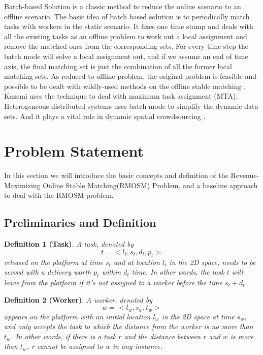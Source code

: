 \documentclass[color,twoside,amssymb,twocolumn]{article}
\begin{document}
Batch-based Solution\cite{kazemi2012geocrowd} is a classic method to reduce the online scenario to an offline scenario. The basic idea of batch based solution is to periodically match tasks with workers in the static scenario\cite{kazemi2012geocrowd,DBLP:conf/gis/KazemiSC13}. It fixes one time stamp and deals with all the existing tasks as an offline problem to work out a local assignment and remove the matched ones from the corresponding sets. For every time step the batch mode will solve a local assignment out, and if we assume an end of time axis, the final matching set is just the combination of all the former local matching sets. As reduced to offline problem, the original problem is feasible and possible to be dealt with wildly-used methods on the offline stable matching \cite{gale1962college}. Kazemi uses the technique to deal with maximum task assignment (MTA)\cite{kazemi2012geocrowd,DBLP:conf/gis/KazemiSC13}. Heterogeneous distributed systems\cite{lee1999online} uses batch mode to simplify the dynamic data sets. And it plays a vital role in dynamic spatial crowdsourcing \cite{DBLP:journals/sigspatial/TongZ18,Tong2019,DBLP:conf/icde/WangTLXXL19,DBLP:conf/icde/ZengTCZ18,tongTKDE19}.

\section{Problem Statement}

\noindent In this section we will introduce the basic concepts and definition of the Revenue-Maximizing Online Stable Matching(RMOSM) Problem, and a baseline approach to deal with the RMOSM problem.

\subsection{Preliminaries and Definition} 

\textbf{Definition 1 (Task)}. {\it A task, denoted by 
	\begin{equation}
	t=< l_t,s_t,d_t,p_t >
	\end{equation}
	released on the platform at time $s_t$ and at location $l_t$ in the 2D space, needs to be served with a delivery worth $p_t$ within $d_t$ time. In other words, the task $t$ will leave from the platform if it's not assigned to a worker before the time $s_t+d_t$.}

\textbf{Definition 2 (Worker)}. {\it A worker, denoted by 
	\begin{equation}
	w = <l_w,s_w,t_w>
	\end{equation}
	appears on the platform with an initial location $l_w$ in the 2D space at time $s_w$, and only accepts the task to which the distance from the worker is no more than $t_w$. In other words, if there is a task $r$ and the distance between $r$ and $w$ is more than $t_w$, r cannot be assigned to w in any instance.}
\end{document}
